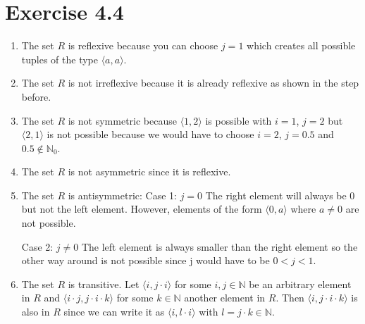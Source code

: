 \documentclass{article} %
\newcommand{\homeworkNumber}{4}
\begin{document}
\section*{Exercise \homeworkNumber.4}
\begin{enumerate}[-]
\item The set $R$ is reflexive because you can choose $j = 1$ which creates all possible tuples of the type $\langle a, a \rangle$.

\item The set $R$ is not irreflexive because it is already reflexive as shown in the step before.

\item The set $R$ is not symmetric because $\langle 1, 2 \rangle$ is possible with $i = 1$, $j = 2$ but $\langle 2, 1 \rangle$ is not possible because we would have to choose $i = 2$, $j = 0.5$ and $0.5 \notin \mathbb{N}_0$.

\item The set $R$ is not asymmetric since it is reflexive.

\item The set $R$ is antisymmetric: \newline
Case 1: $j = 0$ \newline 
The right element will always be 0 but not the left element.
However, elements of the form $\langle 0, a \rangle$ where $a \neq 0$ are not possible.


Case 2: $j \neq 0$ \newline The left element is always smaller than the right element so the other way around is not possible since j would have to be $0 < j < 1$.

\item The set $R$ is transitive. Let $\langle i, j \cdot i \rangle$ for some $i,j \in \mathbb{N}$ be an arbitrary element in $R$ and  
$\langle i \cdot j, j \cdot i \cdot k \rangle$ for some $k \in \mathbb{N}$ another element in $R$. Then 
$\langle i, j \cdot i \cdot k \rangle$ is also in $R$ since we can write it as $\langle i, l \cdot i \rangle$ with $l = j \cdot k \in \mathbb{N}$.


\end{enumerate}
\end{document}
